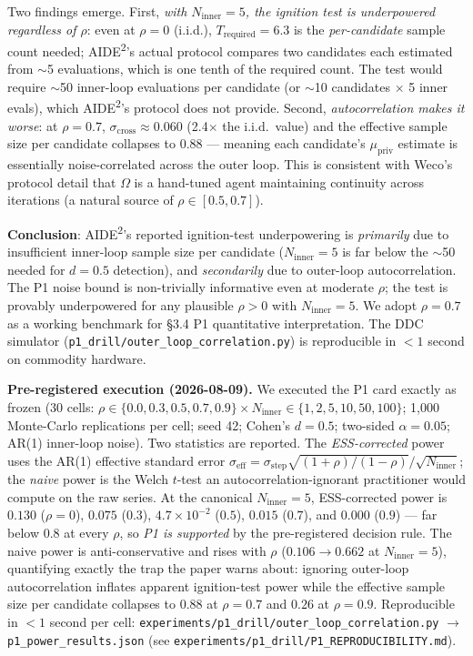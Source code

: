 \documentclass{article}
\theoremstyle{definition}
\begin{document}
Two findings emerge. First, \emph{with $N_{\text{inner}} = 5$, the ignition test is underpowered regardless of $\rho$}: even at $\rho = 0$ (i.i.d.), $T_{\text{required}} = 6.3$ is the \emph{per-candidate} sample count needed; AIDE\textsuperscript{2}'s actual protocol compares two candidates each estimated from $\sim$5 evaluations, which is one tenth of the required count. The test would require $\sim$50 inner-loop evaluations per candidate (or $\sim$10 candidates $\times$ 5 inner evals), which AIDE\textsuperscript{2}'s protocol does not provide. Second, \emph{autocorrelation makes it worse}: at $\rho = 0.7$, $\sigma_{\text{cross}} \approx 0.060$ (2.4$\times$ the i.i.d.\ value) and the effective sample size per candidate collapses to 0.88 --- meaning each candidate's $\mu_{\text{priv}}$ estimate is essentially noise-correlated across the outer loop. This is consistent with Weco's protocol detail that $\Omega$ is a hand-tuned agent maintaining continuity across iterations (a natural source of $\rho \in [0.5, 0.7]$).

\textbf{Conclusion}: AIDE\textsuperscript{2}'s reported ignition-test underpowering is \emph{primarily} due to insufficient inner-loop sample size per candidate ($N_{\text{inner}} = 5$ is far below the $\sim$50 needed for $d = 0.5$ detection), and \emph{secondarily} due to outer-loop autocorrelation. The P1 noise bound is non-trivially informative even at moderate $\rho$; the test is provably underpowered for any plausible $\rho > 0$ with $N_{\text{inner}} = 5$. We adopt $\rho = 0.7$ as a working benchmark for \S3.4 P1 quantitative interpretation. The DDC simulator (\texttt{p1\_drill/outer\_loop\_correlation.py}) is reproducible in $<1$ second on commodity hardware.

\textbf{Pre-registered execution (2026-08-09).} We executed the P1 card exactly as frozen (30 cells: $\rho \in \{0.0, 0.3, 0.5, 0.7, 0.9\} \times N_{\text{inner}} \in \{1, 2, 5, 10, 50, 100\}$; 1{,}000 Monte-Carlo replications per cell; seed 42; Cohen's $d = 0.5$; two-sided $\alpha = 0.05$; AR(1) inner-loop noise). Two statistics are reported. The \emph{ESS-corrected} power uses the AR(1) effective standard error $\sigma_{\text{eff}} = \sigma_{\text{step}} \sqrt{(1+\rho)/(1-\rho)} / \sqrt{N_{\text{inner}}}$; the \emph{naive} power is the Welch $t$-test an autocorrelation-ignorant practitioner would compute on the raw series. At the canonical $N_{\text{inner}} = 5$, ESS-corrected power is $0.130$ ($\rho=0$), $0.075$ ($0.3$), $4.7\times10^{-2}$ ($0.5$), $0.015$ ($0.7$), and $0.000$ ($0.9$) --- far below $0.8$ at every $\rho$, so \emph{P1 is supported} by the pre-registered decision rule. The naive power is anti-conservative and rises with $\rho$ ($0.106 \to 0.662$ at $N_{\text{inner}}=5$), quantifying exactly the trap the paper warns about: ignoring outer-loop autocorrelation inflates apparent ignition-test power while the effective sample size per candidate collapses to $0.88$ at $\rho=0.7$ and $0.26$ at $\rho=0.9$. Reproducible in $<1$ second per cell: \texttt{experiments/p1\_drill/outer\_loop\_correlation.py} $\rightarrow$ \texttt{p1\_power\_results.json} (see \texttt{experiments/p1\_drill/P1\_REPRODUCIBILITY.md}).
\end{document}
